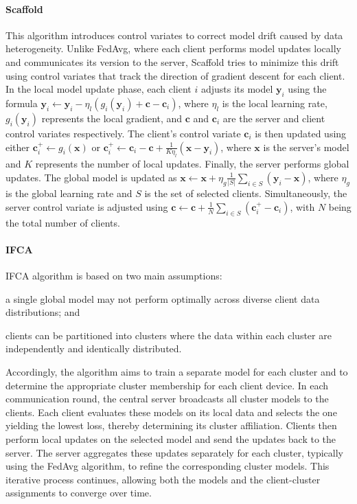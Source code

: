 \paragraph{Scaffold}
This algorithm introduces control variates to correct model drift caused by data heterogeneity. 
%
Unlike FedAvg, where each client performs model updates locally and communicates its version to the server, 
 Scaffold tries to minimize this drift using control variates that track the direction of gradient descent for each client.
%
In the local model update phase, each client $i$ adjusts its model $\mathbf{y}_i$ using the formula 
 $\mathbf{y}_i \leftarrow \mathbf{y}_i - \eta_l (g_i(\mathbf{y}_i) + \mathbf{c} - \mathbf{c}_i)$, where $\eta_l$ is the 
 local learning rate, $g_i(\mathbf{y}_i)$ represents the local gradient, and $\mathbf{c}$ and $\mathbf{c}_i$ are the server 
 and client control variates respectively.
%
The client's control variate $\mathbf{c}_i$ is then updated using either $\mathbf{c}^+_i \leftarrow g_i(\mathbf{x})$ or 
 $\mathbf{c}^+_i \leftarrow \mathbf{c}_i - \mathbf{c} + \frac{1}{K\eta_l}(\mathbf{x} - \mathbf{y}_i)$, where $\mathbf{x}$ is the server's model 
 and $K$ represents the number of local updates.
%
Finally, the server performs global updates. 
%
The global model is updated as $\mathbf{x} \leftarrow \mathbf{x} + \eta_g \frac{1}{|S|} \sum_{i \in S} (\mathbf{y}_i - \mathbf{x})$, 
 where $\eta_g$ is the global learning rate and $S$ is the set of selected clients. 
% 
Simultaneously, the server control variate is adjusted using 
 $\mathbf{c} \leftarrow \mathbf{c} + \frac{1}{N} \sum_{i \in S} (\mathbf{c}^+_i - \mathbf{c}_i)$, 
 with $N$ being the total number of clients.

\paragraph{IFCA}

IFCA algorithm is based on two main assumptions:
\begin{enumerate*}[label=(\roman*)]
    \item a single global model may not perform optimally across diverse client data distributions; and
    \item clients can be partitioned into clusters where the data within each cluster are independently and identically distributed.
\end{enumerate*}
%
Accordingly, the algorithm aims to train a separate model for each cluster and to determine the appropriate 
 cluster membership for each client device.
%
In each communication round, the central server broadcasts all cluster models to the clients. 
%
Each client evaluates these models on its local data and selects the one yielding the lowest loss, 
 thereby determining its cluster affiliation. 
%
Clients then perform local updates on the selected model and send the updates back to the server. 
%
The server aggregates these updates separately for each cluster, typically using the FedAvg algorithm, 
 to refine the corresponding cluster models.
% 
This iterative process continues, allowing both the models and the client-cluster assignments 
 to converge over time.

